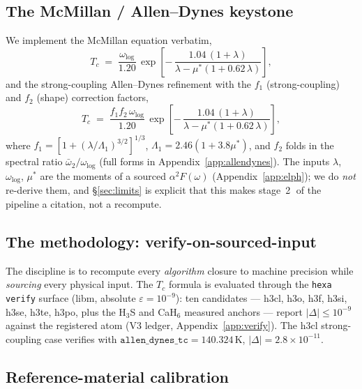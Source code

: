 \documentclass[11pt,a4paper]{article}
\begin{document}
\subsection{The McMillan / Allen--Dynes keystone}

We implement the McMillan equation \citep{mcmillan1968} verbatim,
\begin{equation}
T_c \;=\; \frac{\omega_{\log}}{1.20}\,
  \exp\!\left[-\,\frac{1.04\,(1+\lambda)}{\lambda - \mu^{*}(1+0.62\,\lambda)}\right],
\label{eq:mcmillan}
\end{equation}
and the strong-coupling Allen--Dynes refinement \citep{allendynes1975}
with the $f_1$ (strong-coupling) and $f_2$ (shape) correction factors,
\begin{equation}
T_c \;=\; \frac{f_1 f_2\,\omega_{\log}}{1.20}\,
  \exp\!\left[-\,\frac{1.04\,(1+\lambda)}{\lambda - \mu^{*}(1+0.62\,\lambda)}\right],
\label{eq:allendynes}
\end{equation}
where $f_1\!=\![1+(\lambda/\Lambda_1)^{3/2}]^{1/3}$,
$\Lambda_1\!=\!2.46(1+3.8\mu^{*})$, and $f_2$ folds in the spectral
ratio $\bar\omega_2/\omega_{\log}$ (full forms in
Appendix~\ref{app:allendynes}). The inputs $\lambda$, $\omega_{\log}$,
$\mu^{*}$ are the moments of a sourced $\alpha^2F(\omega)$
(Appendix~\ref{app:elph}); we do \emph{not} re-derive them, and
\S\ref{sec:limits} is explicit that this makes
stage~\textcircled{\scriptsize 2} of the pipeline a citation, not a
recompute.

\subsection{The methodology: verify-on-sourced-input}

The discipline is to recompute every \emph{algorithm} closure to
machine precision while \emph{sourcing} every physical input. The
$T_c$ formula is evaluated through the \texttt{hexa verify} surface
(libm, absolute $\varepsilon\!=\!10^{-9}$): ten candidates ---
h3cl, h3o, h3f, h3si, h3se, h3te, h3po, plus the H$_3$S and CaH$_6$
measured anchors --- report $|\Delta|\!\le\!10^{-9}$ against the
registered atom (V3 ledger, Appendix~\ref{app:verify}). The h3cl
strong-coupling case verifies with
$\texttt{allen\_dynes\_tc}\!=\!140.324$\,K, $|\Delta|\!=\!2.8\!\times\!10^{-11}$.

\subsection{Reference-material calibration}
\end{document}
